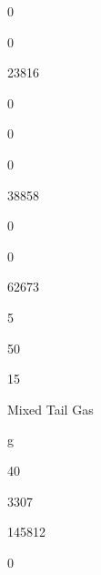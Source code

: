 \documentclass[a4paper,portrait,12pt]{article}
\begin{document}
0





0





23816





0





0





0





38858





0





0





62673





5





50





15





\begin{flushleft}
Mixed Tail Gas
\end{flushleft}





\begin{flushleft}
g
\end{flushleft}





40





3307





145812





0
\end{document}
